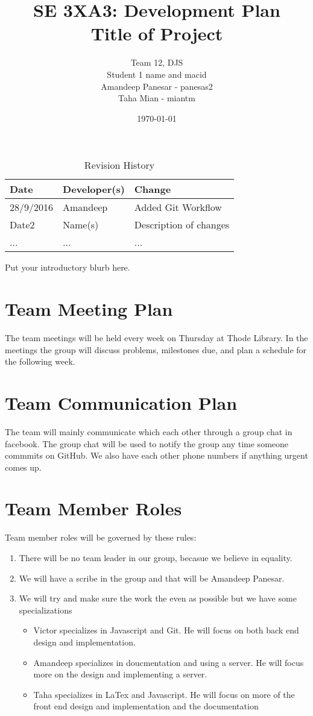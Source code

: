 \documentclass{article}
\title{SE 3XA3: Development Plan\\Title of Project}
\author{Team 12, DJS
		\\ Student 1 name and macid
		\\ Amandeep Panesar - panesas2
		\\ Taha Mian - miantm
}
\date{\today}
\begin{document}
\begin{table}[hp]
\caption{Revision History} \label{TblRevisionHistory}
\begin{tabularx}{\textwidth}{llX}
\toprule
\textbf{Date} & \textbf{Developer(s)} & \textbf{Change}\\
\midrule
28/9/2016 & Amandeep & Added Git Workflow\\
Date2 & Name(s) & Description of changes\\
... & ... & ...\\
\bottomrule
\end{tabularx}
\end{table}

\newpage

\maketitle

Put your introductory blurb here.

\section{Team Meeting Plan}
The team meetings will be held every week on Thursday at Thode Library. In the meetings the group will discuss problems, milestones due, and plan a schedule for the following week.
\section{Team Communication Plan}
The team will mainly communicate which each other through a group chat in facebook. The group chat will be used to notify the group any time someone commmits on GitHub. We also have each other phone numbers if anything urgent comes up.
\section{Team Member Roles}
Team member roles will be governed by these rules:
\begin{enumerate}
\item There will be no team leader in our group, becasue we believe in equality.
\item We will have a scribe in the group and that will be Amandeep Panesar.
\item We will try and make sure the work the even as possible but we have some specializations
\begin{itemize}
\item Victor specializes in Javascript and Git. He will focus on both back end design and implementation.
\item Amandeep specializes in doucmentation and using a server. He will focus more on the design and implementing a server.
\item Taha specializes in LaTex and Javascript. He will focus on more of the front end design and implementation and the documentation
\end{itemize}
\end{enumerate}
\end{document}
